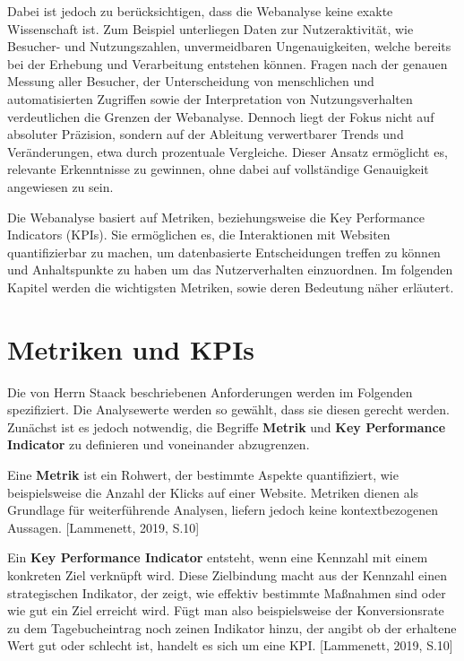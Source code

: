Dabei ist jedoch zu berücksichtigen, dass die Webanalyse keine exakte Wissenschaft ist. Zum Beispiel unterliegen Daten zur Nutzeraktivität, wie Besucher- und Nutzungszahlen, unvermeidbaren Ungenauigkeiten, welche bereits bei der Erhebung und Verarbeitung entstehen können. Fragen nach der genauen Messung aller Besucher, der Unterscheidung von menschlichen und automatisierten Zugriffen sowie der Interpretation von Nutzungsverhalten verdeutlichen die Grenzen der Webanalyse. Dennoch liegt der Fokus nicht auf absoluter Präzision, sondern auf der Ableitung verwertbarer Trends und Veränderungen, etwa durch prozentuale Vergleiche. Dieser Ansatz ermöglicht es, relevante Erkenntnisse zu gewinnen, ohne dabei auf vollständige Genauigkeit angewiesen zu sein. \parencite[Kap.1.4]{Hassler2019}

Die Webanalyse basiert auf Metriken, beziehungsweise die Key Performance Indicators (KPIs). Sie ermöglichen es, die Interaktionen mit Websiten quantifizierbar zu machen, um datenbasierte Entscheidungen treffen zu können und Anhaltspunkte zu haben um das Nutzerverhalten einzuordnen. Im folgenden Kapitel werden die wichtigsten Metriken, sowie deren Bedeutung näher erläutert.

\section{Metriken und KPIs} %
\label{sec:kpis}
Die von Herrn Staack beschriebenen Anforderungen werden im Folgenden spezifiziert. Die Analysewerte werden so gewählt, dass sie diesen gerecht werden. Zunächst ist es jedoch notwendig, die Begriffe \textbf{\glqq Metrik\grqq{}} und \textbf{\glqq Key Performance Indicator\grqq{}} zu definieren und voneinander abzugrenzen.

Eine \textbf{Metrik} ist ein Rohwert, der bestimmte Aspekte quantifiziert, wie beispielsweise die Anzahl der Klicks auf einer Website. Metriken dienen als Grundlage für weiterführende Analysen, liefern jedoch keine kontextbezogenen Aussagen. [Lammenett, 2019, S.10]

Ein \textbf{Key Performance Indicator} entsteht, wenn eine Kennzahl mit einem konkreten Ziel verknüpft wird. Diese Zielbindung macht aus der Kennzahl einen strategischen Indikator, der zeigt, wie effektiv bestimmte Maßnahmen sind oder wie gut ein Ziel erreicht wird. Fügt man also beispielsweise der Konversionsrate zu dem Tagebucheintrag noch zeinen Indikator hinzu, der angibt ob der erhaltene Wert gut oder schlecht ist, handelt es sich um eine KPI. [Lammenett, 2019, S.10]

